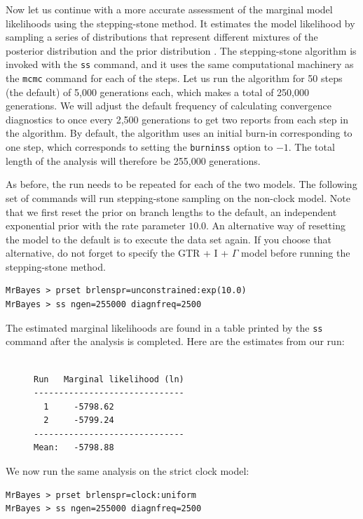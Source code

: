 \documentclass[12pt]{book}
\begin{document}
Now let us continue with a more accurate assessment of the marginal model likelihoods using the
stepping-stone method. It estimates the model likelihood by sampling a series of distributions that
represent different mixtures of the posterior distribution and the prior distribution
\citep{xie11}. The stepping-stone algorithm is invoked with the \texttt{ss} command, and it uses
the same computational machinery as the \texttt{mcmc} command for each of the steps. Let us run the
algorithm for 50 steps (the default) of 5,000 generations each, which makes a total of 250,000
generations. We will adjust the default frequency of calculating convergence diagnostics to once
every 2,500 generations to get two reports from each step in the algorithm. By default, the
algorithm uses an initial burn-in corresponding to one step, which corresponds to setting the
\texttt{burninss} option to $-1$. The total length of the analysis will therefore be 255,000
generations.

As before, the run needs to be repeated for each of the two models. The following set of commands
will run stepping-stone sampling on the non-clock model. Note that we first reset the prior on
branch lengths to the default, an independent exponential prior with the rate parameter $10.0$. An
alternative way of resetting the model to the default is to execute the data set again. If you
choose that alternative, do not forget to specify the GTR + I + $\Gamma$ model before running the
stepping-stone method.

\begin{Verbatim}
MrBayes > prset brlenspr=unconstrained:exp(10.0)
MrBayes > ss ngen=255000 diagnfreq=2500
\end{Verbatim}

The estimated marginal likelihoods are found in a table printed by the \texttt{ss} command after
the analysis is completed. Here are the estimates from our run:

\begin{figure}[h]
\centering
\begin{BVerbatim}

Run   Marginal likelihood (ln)
------------------------------
  1     -5798.62
  2     -5799.24
------------------------------
Mean:   -5798.88
\end{BVerbatim}
\end{figure}

We now run the same analysis on the strict clock model:

\begin{Verbatim}
MrBayes > prset brlenspr=clock:uniform
MrBayes > ss ngen=255000 diagnfreq=2500
\end{Verbatim}
\end{document}
